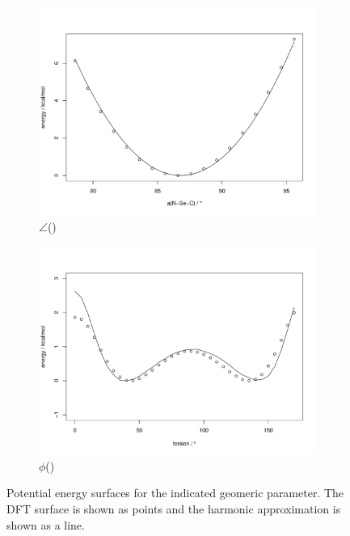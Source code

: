 \begin{refsection}
\begin{figure}
\begin{subfigure}{0.4\linewidth}
        \includegraphics[width=\linewidth]{Figures/ch2-sifig/NSeC.pdf}
        \caption{$\angle$()}
    \end{subfigure}
    \begin{subfigure}{0.4\linewidth}
        \includegraphics[width=\linewidth]{Figures/ch2-sifig/SeNCC.pdf}
        \caption{$\phi$()}
    \end{subfigure}
    \caption[Potential energy surfaces of ebselen.]{Potential energy surfaces for the indicated geomeric parameter. The DFT surface is shown as points and the harmonic approximation is shown as a line.}
    \label{fig:pes}
\end{figure}


\end{refsection}
